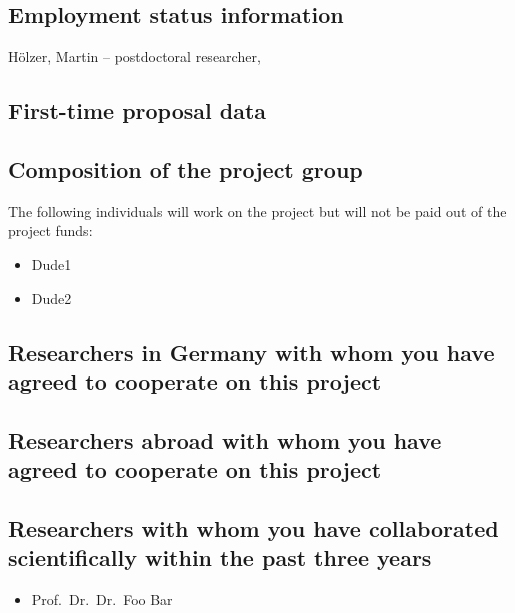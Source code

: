 \documentclass{scrartcl}
\begin{document}
\subsection{Employment status information}
H\"olzer, Martin -- postdoctoral researcher, 

\subsection{First-time proposal data}

\subsection{Composition of the project group}
The following individuals will work on the project but will not be paid out of
the project funds:

\begin{itemize}
\item Dude1
\item Dude2
\end{itemize}

\subsection{Researchers in Germany with whom you have agreed to cooperate on this project}

\subsection{Researchers abroad with whom you have agreed to cooperate on this project}

\subsection{Researchers with whom you have collaborated scientifically within the past three years}
\begin{itemize}
  \item Prof.\ Dr.\ Dr.\ Foo Bar
\end{itemize}
\end{document}
